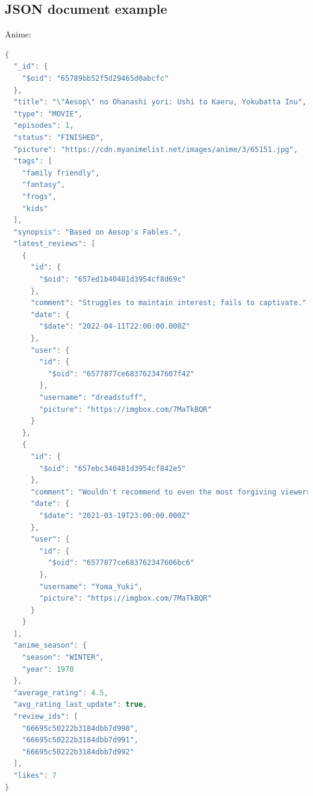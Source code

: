 \subsection*{JSON document example}
Anime:
\begin{mdframed}[backgroundcolor=yellow!20, innerleftmargin=10pt, innerrightmargin=10pt]
    \begin{lstlisting}[language=java]
  {
  "_id": {
    "$oid": "65789bb52f5d29465d0abcfc"
  },
  "title": "\"Aesop\" no Ohanashi yori: Ushi to Kaeru, Yokubatta Inu",
  "type": "MOVIE",
  "episodes": 1,
  "status": "FINISHED",
  "picture": "https://cdn.myanimelist.net/images/anime/3/65151.jpg",
  "tags": [
    "family friendly",
    "fantasy",
    "frogs",
    "kids"
  ],
  "synopsis": "Based on Aesop's Fables.",
  "latest_reviews": [
    {
      "id": {
        "$oid": "657ed1b40481d3954cf8d69c"
      },
      "comment": "Struggles to maintain interest; fails to captivate.",
      "date": {
        "$date": "2022-04-11T22:00:00.000Z"
      },
      "user": {
        "id": {
          "$oid": "6577877ce683762347607f42"
        },
        "username": "dreadstuff",
        "picture": "https://imgbox.com/7MaTkBQR"
      }
    },
    {
      "id": {
        "$oid": "657ebc340481d3954cf842e5"
      },
      "comment": "Wouldn't recommend to even the most forgiving viewers.",
      "date": {
        "$date": "2021-03-19T23:00:00.000Z"
      },
      "user": {
        "id": {
          "$oid": "6577877ce683762347606bc6"
        },
        "username": "Yoma_Yuki",
        "picture": "https://imgbox.com/7MaTkBQR"
      }
    }
  ],
  "anime_season": {
    "season": "WINTER",
    "year": 1970
  },
  "average_rating": 4.5,
  "avg_rating_last_update": true,
  "review_ids": [
    "66695c50222b3184dbb7d990",
    "66695c50222b3184dbb7d991",
    "66695c50222b3184dbb7d992"
  ],
  "likes": 7
}
    \end{lstlisting}
\end{mdframed}

